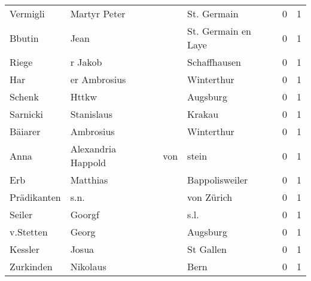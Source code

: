 \begin{tabular}{llllrr}
                 Vermigli &                       Martyr Peter &             &                                 St. Germain &          0 &         1 \\
                   Bbutin &                               Jean &             &                         St. Germain en Laye &          0 &         1 \\
                    Riege &                            r Jakob &             &                                Schaffhausen &          0 &         1 \\
                      Har &                       er Ambrosius &             &                                  Winterthur &          0 &         1 \\
                   Schenk &                              Httkw &             &                                    Augsburg &          0 &         1 \\
                 Sarnicki &                         Stanislaus &             &                                      Krakau &          0 &         1 \\
                  Bäiarer &                          Ambrosius &             &                                  Winterthur &          0 &         1 \\
                     Anna &                Alexandria  Happold &         von &                                       stein &          0 &         1 \\
                      Erb &                           Matthias &             &                              Bappolisweiler &          0 &         1 \\
              Prädikanten &                               s.n. &             &                                  von Zürich &          0 &         1 \\
                   Seiler &                             Goorgf &             &                                        s.l. &          0 &         1 \\
                v.Stetten &                              Georg &             &                                    Augsburg &          0 &         1 \\
                  Kessler &                              Josua &             &                                   St Gallen &          0 &         1 \\
                Zurkinden &                           Nikolaus &             &                                        Bern &          0 &         1 \\

\end{tabular}
